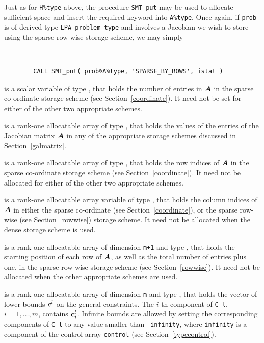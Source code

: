 \documentclass{galahad}
\newcommand{\packagename}{LPA}
\begin{document}
\begin{description}
\begin{description}
Just as for {\tt H\%type} above, the procedure {\tt SMT\_put}
may be used to allocate sufficient space and insert the required keyword
into {\tt A\%type}.
Once again, if {\tt prob} is of derived type {\tt \packagename\_problem\_type}
and involves a Jacobian we wish to store using the sparse row-wise
storage scheme, we may simply
{\tt
\begin{verbatim}
        CALL SMT_put( prob%A%type, 'SPARSE_BY_ROWS', istat )
\end{verbatim}
}
\noindent

 is a scalar variable of type \integer, that
holds the number of entries in ${\bm{A}}$
in the sparse co-ordinate storage scheme (see Section~\ref{coordinate}).
It need not be set for either of the other two appropriate schemes.

 is a rank-one allocatable array of type \realdp, that holds
the values of the entries of the Jacobian matrix ${\bm{A}}$ in any of the
appropriate storage schemes discussed in Section~\ref{galmatrix}.

 is a rank-one allocatable array of type \integer,
that holds the row indices of ${\bm{A}}$ in the sparse co-ordinate storage
scheme (see Section~\ref{coordinate}).
It need not be allocated for either of the other two appropriate schemes.

 is a rank-one allocatable array variable of type \integer,
that holds the column indices of ${\bm{A}}$ in either the sparse co-ordinate
(see Section~\ref{coordinate}), or the sparse row-wise
(see Section~\ref{rowwise}) storage scheme.
It need not be allocated when the dense storage scheme is used.

 is a rank-one allocatable array of dimension {\tt m+1} and type
\integer, that holds the
starting position of each row of ${\bm{A}}$, as well
as the total number of entries plus one, in the sparse row-wise storage
scheme (see Section~\ref{rowwise}). It need not be allocated when the
other appropriate schemes are used.

\end{description}

 is a rank-one allocatable array of dimension {\tt m} and type
\realdp, that holds the vector of lower bounds ${\bm{c}}^{l}$
on the general constraints. The $i$-th component of
{\tt C\_l}, $i = 1, \ldots , m$, contains ${\bm{c}}_{i}^{l}$.
Infinite bounds are allowed by setting the corresponding
components of {\tt C\_l} to any value smaller than {\tt -infinity},
where {\tt infinity} is a component of the control array {\tt control}
(see Section~\ref{typecontrol}).


\end{description}
\end{document}
